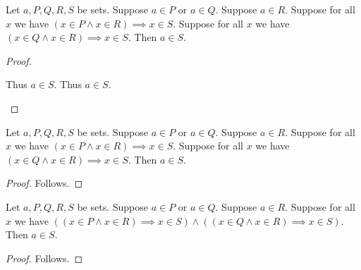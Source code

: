 \begin{proposition}\label{explicit_conjunctive_cases}
    Let $a,P,Q,R,S$ be sets.
    Suppose $a\in P$ or $a\in Q$.
    Suppose $a\in R$.
    Suppose for all $x$ we have $(x\in P\land x\in R)\implies x\in S$.
    Suppose for all $x$ we have $(x\in Q\land x\in R)\implies x\in S$.
    Then $a\in S$.
\end{proposition}
\begin{proof}
    \begin{byCase}
        Thus $a\in S$.
        Thus $a\in S$.
    \end{byCase}
\end{proof}

\begin{proposition}\label{obvious_conjunctive_cases}
    Let $a,P,Q,R,S$ be sets.
    Suppose $a\in P$ or $a\in Q$.
    Suppose $a\in R$.
    Suppose for all $x$ we have $(x\in P\land x\in R)\implies x\in S$.
    Suppose for all $x$ we have $(x\in Q\land x\in R)\implies x\in S$.
    Then $a\in S$.
\end{proposition}
\begin{proof}
    Follows.
\end{proof}

\begin{proposition}\label{obvious_projected_cases}
    Let $a,P,Q,R,S$ be sets.
    Suppose $a\in P$ or $a\in Q$.
    Suppose $a\in R$.
    Suppose for all $x$ we have
        $((x\in P\land x\in R)\implies x\in S)\land ((x\in Q\land x\in R)\implies x\in S)$.
    Then $a\in S$.
\end{proposition}
\begin{proof}
    Follows.
\end{proof}
